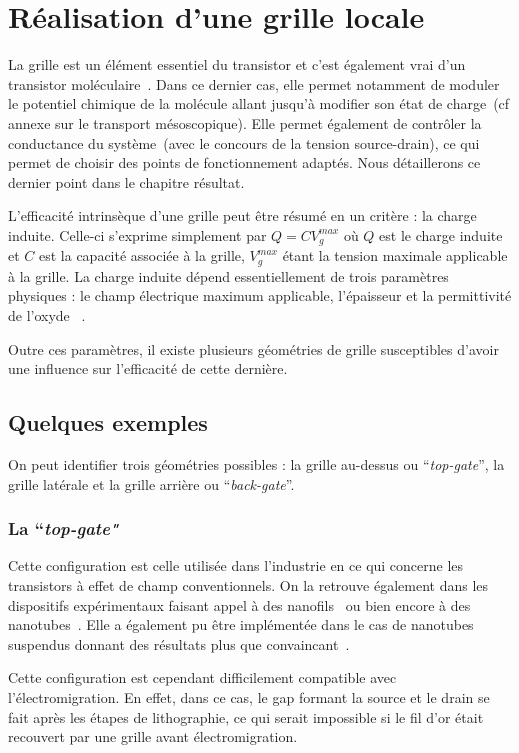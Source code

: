\section{Réalisation d'une grille locale}
La grille est un élément essentiel du transistor et c'est également vrai d'un transistor moléculaire~\cite{Datta2009,Zant2006}. Dans ce dernier cas, elle permet notamment de moduler le potentiel chimique de la molécule allant jusqu'à modifier son état de charge~(cf annexe sur le transport mésoscopique). Elle permet également de contrôler la conductance du système~(avec le concours de la tension source-drain), ce qui permet de choisir des points de fonctionnement adaptés. Nous détaillerons ce dernier point dans le chapitre résultat. 

L'efficacité intrinsèque d'une grille peut être résumé en un critère : la charge induite. Celle-ci s'exprime simplement par $Q = CV_g^{max}$ où $Q$ est le charge induite et $C$ est la capacité associée à la grille, $V_g^{max}$ étant la tension maximale applicable à la grille. La charge induite dépend essentiellement de trois paramètres physiques : le champ électrique maximum applicable, l'épaisseur et la permittivité de l'oxyde ~\cite{Biercuk2003}. 

Outre ces paramètres, il existe plusieurs géométries de grille susceptibles d'avoir une influence sur l’efficacité de cette dernière.

\subsection{Quelques exemples}
On peut identifier trois géométries possibles : la grille au-dessus ou  ``\textit{top-gate}'', la grille latérale et la grille arrière ou  ``\textit{back-gate}''.

\subsubsection{La ``\textit{top-gate"}}
Cette configuration est celle utilisée dans l'industrie en ce qui concerne les transistors à effet de champ conventionnels. On la retrouve également dans les dispositifs expérimentaux faisant appel à des nanofils~\cite{Fasth2005} ou bien encore à des nanotubes~\cite{Javey2002}. Elle a également pu être implémentée dans le cas de nanotubes suspendus donnant des résultats plus que convaincant~\cite{Leturcq2009}.

Cette configuration est cependant difficilement compatible avec l'électromigration. En effet, dans ce cas, le gap formant la source et le drain se fait après les étapes de lithographie, ce qui serait impossible si le fil d'or était recouvert par une grille avant électromigration.

